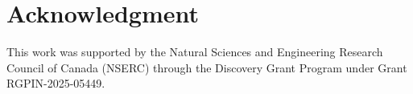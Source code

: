 \section*{Acknowledgment}
This work was supported by the Natural Sciences and Engineering Research Council of Canada (NSERC) through the Discovery Grant Program under Grant \mbox{RGPIN-2025-05449}.
